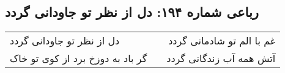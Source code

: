 \begin{center}
\section*{رباعی شماره ۱۹۴: دل از نظر تو جاودانی گردد}
\label{sec:sh194}
\begin{longtable}{l p{0.5cm} r}
دل از نظر تو جاودانی گردد
&&
غم با الم تو شادمانی گردد
\\
گر باد به دوزخ برد از کوی تو خاک
&&
آتش همه آب زندگانی گردد
\\
\end{longtable}
\end{center}
